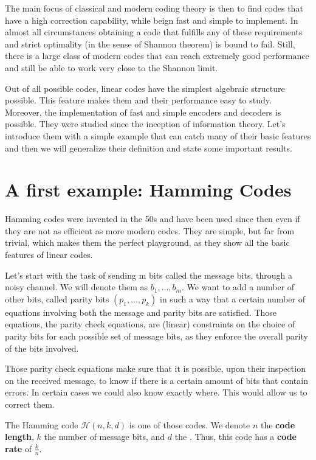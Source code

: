 The main focus of classical and modern coding theory is then to find codes that have a high correction capability, while beign fast and simple to implement. In almost all circumstances obtaining a code that fulfills any of these requirements and strict optimality (in the sense of Shannon theorem) is bound to fail. Still, there is a large class of modern codes that can reach extremely good performance and still be able to work very close to the Shannon limit.

Out of all possible codes, linear codes have the simplest algebraic structure possible. This feature makes them and their performance easy to study. Moreover, the implementation of fast and simple encoders and decoders is possible. They were studied since the inception of information theory. Let's introduce them with a simple example that can catch many of their basic features and then we will generalize their definition and state some important results.

\section{A first example: Hamming Codes}
Hamming codes were invented in the 50s and have been used since then even if they are not as efficient as more modern codes. They are simple, but far from trivial, which makes them the perfect playground, as they show all the basic features of linear codes.

Let's start with the task of sending m bits called the message bits, through a noisy channel. We will denote them as $b_1, \dots, b_m$. We want to add a number of other bits, called parity bits $(p_1, \dots, p_k)$ in such a way that a certain number of equations involving both the message and parity bits are satisfied. Those equations, the parity check equations, are (linear) constraints on the choice of parity bits for each possible set of message bits, as they enforce the overall parity of the bits involved.

Those parity check equations make sure that it is possible, upon their inspection on the received message, to know if there is a certain amount of bits that contain errors. In certain cases we could also know exactly where. This would allow us to correct them.

The Hamming code $\mathcal{H}(n, k, d)$ is one of those codes. We denote $n$ the \textbf{code length}, $k$ the number of message bits, and $d$ the .
Thus, this code has a \textbf{code rate} of $\frac{k}{n}$.

